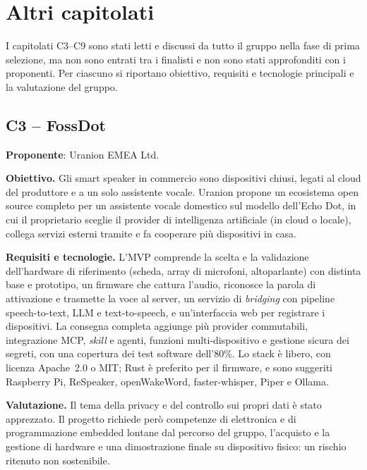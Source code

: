 
\section{Altri capitolati}\label{sec:altri}

I capitolati C3--C9 sono stati letti e discussi da tutto il gruppo nella
fase di prima selezione, ma non sono entrati tra i finalisti e non sono
stati approfonditi con i proponenti. Per ciascuno si riportano obiettivo,
requisiti e tecnologie principali e la valutazione del gruppo.

\subsection{C3 -- FossDot}
\textbf{Proponente}: Uranion EMEA Ltd.

\textbf{Obiettivo.} Gli smart speaker in commercio sono dispositivi chiusi,
legati al cloud del produttore e a un solo assistente vocale. Uranion
propone un ecosistema open source completo per un assistente vocale
domestico sul modello dell'Echo Dot, in cui il proprietario sceglie il
provider di intelligenza artificiale (in cloud o locale), collega servizi
esterni tramite  e fa cooperare più dispositivi in casa.

\textbf{Requisiti e tecnologie.} L'MVP comprende la scelta e la validazione
dell'hardware di riferimento (scheda, array di microfoni, altoparlante) con
distinta base e prototipo, un firmware che cattura l'audio, riconosce la
parola di attivazione e trasmette la voce al server, un servizio di
\emph{bridging} con pipeline speech-to-text, LLM e text-to-speech, e
un'interfaccia web per registrare i dispositivi. La consegna completa
aggiunge più provider commutabili, integrazione MCP, \emph{skill} e
agenti, funzioni multi-dispositivo e gestione sicura dei segreti, con una
copertura dei test software dell'80\%. Lo stack è libero, con licenza
Apache~2.0 o MIT; Rust è preferito per il firmware, e sono suggeriti
Raspberry Pi, ReSpeaker, openWakeWord, faster-whisper, Piper e Ollama.

\textbf{Valutazione.} Il tema della privacy e del controllo sui propri dati
è stato apprezzato. Il progetto richiede però competenze di elettronica e
di programmazione embedded lontane dal percorso del gruppo, l'acquisto e la
gestione di hardware e una dimostrazione finale su dispositivo fisico: un
rischio ritenuto non sostenibile.

